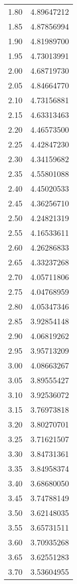 \documentclass[
    number={9},
    title={Epidemics}
]{math486homework}
\begin{document}
\begin{table}[H]
\begin{tabular}{c r}
        1.80 & 4.89647212\\
        1.85 & 4.87856994\\
        1.90 & 4.81989700\\
        1.95 & 4.73013991\\
        2.00 & 4.68719730\\
        2.05 & 4.84664770\\
        2.10 & 4.73156881\\
        2.15 & 4.63313463\\
        2.20 & 4.46573500\\
        2.25 & 4.42847230\\
        2.30 & 4.34159682\\
        2.35 & 4.55801088\\
        2.40 & 4.45020533\\
        2.45 & 4.36256710\\
        2.50 & 4.24821319\\
        2.55 & 4.16533611\\
        2.60 & 4.26286833\\
        2.65 & 4.33237268\\
        2.70 & 4.05711806\\
        2.75 & 4.04768959\\
        2.80 & 4.05347346\\
        2.85 & 3.92854148\\
        2.90 & 4.06819262\\
        2.95 & 3.95713209\\
        3.00 & 4.08663267\\
        3.05 & 3.89555427\\
        3.10 & 3.92536072\\
        3.15 & 3.76973818\\
        3.20 & 3.80270701\\
        3.25 & 3.71621507\\
        3.30 & 3.84731361\\
        3.35 & 3.84958374\\
        3.40 & 3.68680050\\
        3.45 & 3.74788149\\
        3.50 & 3.62148035\\
        3.55 & 3.65731511\\
        3.60 & 3.70935268\\
        3.65 & 3.62551283\\
        3.70 & 3.53604955\\

\end{tabular}
\end{table}
\end{document}
